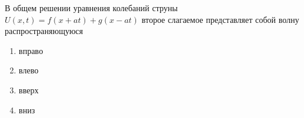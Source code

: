 В общем решении уравнения колебаний струны \(U\left(x,t\right)=f\left(x+at\right)+g(x-at)\) второе слагаемое представляет собой волну распространяющуюся

\begin{enumerate}[label=\arabic*)]
    \item вправо
    \item влево
    \item вверх
    \item вниз
\end{enumerate}

